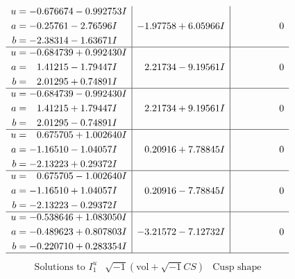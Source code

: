 \documentclass[1p]{elsarticle_modified}
\theoremstyle{definition}
\newcommand{\I}{\sqrt{-1}}
\begin{document}
$$\begin{array}{c|c|c}
\begin{aligned}
u &= -0.676674 - 0.992753 I \\
a &= -0.25761 - 2.76596 I \\
b &= -2.38314 - 1.63671 I\end{aligned}
 & -1.97758 + 6.05966 I & \phantom{-0.000000 } 0 \\ \hline\begin{aligned}
u &= -0.684739 + 0.992430 I \\
a &= \phantom{-}1.41215 - 1.79447 I \\
b &= \phantom{-}2.01295 + 0.74891 I\end{aligned}
 & \phantom{-}2.21734 - 9.19561 I & \phantom{-0.000000 } 0 \\ \hline\begin{aligned}
u &= -0.684739 - 0.992430 I \\
a &= \phantom{-}1.41215 + 1.79447 I \\
b &= \phantom{-}2.01295 - 0.74891 I\end{aligned}
 & \phantom{-}2.21734 + 9.19561 I & \phantom{-0.000000 } 0 \\ \hline\begin{aligned}
u &= \phantom{-}0.675705 + 1.002640 I \\
a &= -1.16510 - 1.04057 I \\
b &= -2.13223 + 0.29372 I\end{aligned}
 & \phantom{-}0.20916 + 7.78845 I & \phantom{-0.000000 } 0 \\ \hline\begin{aligned}
u &= \phantom{-}0.675705 - 1.002640 I \\
a &= -1.16510 + 1.04057 I \\
b &= -2.13223 - 0.29372 I\end{aligned}
 & \phantom{-}0.20916 - 7.78845 I & \phantom{-0.000000 } 0 \\ \hline\begin{aligned}
u &= -0.538646 + 1.083050 I \\
a &= -0.489623 + 0.807803 I \\
b &= -0.220710 + 0.283354 I\end{aligned}
 & -3.21572 - 7.12732 I & \phantom{-0.000000 } 0\\
 \hline 
 \end{array}$$\newpage$$\begin{array}{c|c|c}  
\text{Solutions to }I^u_{1}& \I (\text{vol} + \sqrt{-1}CS) & \text{Cusp shape}\\
 \hline 
\begin{aligned}

\end{aligned}
\end{array}$$
\end{document}
